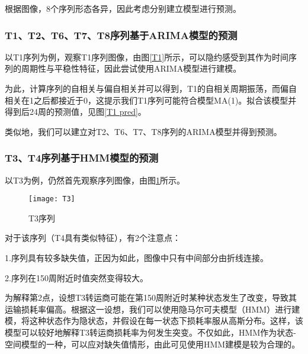 \documentclass{my_paper}
\begin{document}
  根据图像，8个序列形态各异，因此考虑分别建立模型进行预测。
  
  \subsubsection{T1、T2、T6、T7、T8序列基于ARIMA模型的预测}
  以T1序列为例，观察T1序列图像，由图\ref{T1}所示，可以隐约感受到其作为时间序列的周期性与平稳性特征，因此尝试使用ARIMA模型\cite{shumway2000time}进行建模。
\begin{figure}[htbp]
	\centering
  \end{figure}



  
  为此，计算序列的自相关与偏自相关并可以得到，T1的自相关周期振荡，而偏自相关在1之后都接近于0，这提示我们T1序列可能符合模型MA(1)。拟合该模型并得到后24周的预测值，见图\ref{T1 pred}。
 
  

  
  类似地，我们可以建立对T2、T6、T7、T8序列的ARIMA模型并得到预测。
  
  \subsubsection{T3、T4序列基于HMM模型的预测}
  以T3为例，仍然首先观察序列图像，由图\ref{T3}所示。
    \begin{figure}[htbp]
		\centering
		\texttt{[image: T3]}
		\caption{T3序列}\label{T3}
	\end{figure}
  
  
  对于该序列（T4具有类似特征），有2个注意点：
  
  1.序列具有较多缺失值，正因为如此，图像中只有中间部分由折线连接。
  
  2.序列在150周附近时值突然变得较大。
  
  为解释第2点，设想T3转运商可能在第150周附近时某种状态发生了改变，导致其运输损耗率偏高。根据这一设想，我们可以使用隐马尔可夫模型（HMM）\cite{shumway2000time}进行建模，将这种状态作为隐状态，并假设在每一状态下损耗率服从高斯分布。这样，该模型可以较好地解释T3转运商损耗率为何发生突变。不仅如此，HMM作为状态-空间模型的一种，可以应对缺失值情形，由此可见使用HMM建模是较为合理的。
  
\end{document}

